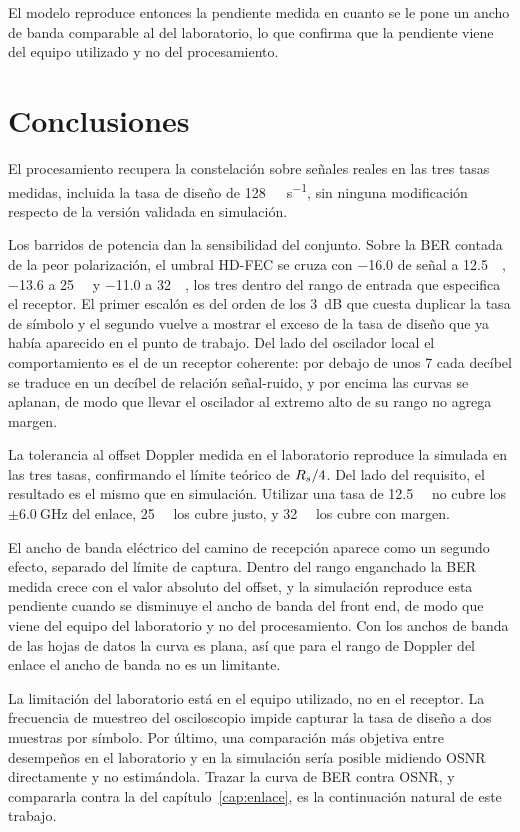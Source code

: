 El modelo reproduce entonces la pendiente medida en cuanto se le pone un ancho
de banda comparable al del laboratorio, lo que confirma que la
pendiente viene del equipo utilizado y no del procesamiento.


\section{Conclusiones}
\label{sec:exp-conclusiones}

El procesamiento recupera la constelaci\'on sobre se\~nales reales en las tres
tasas medidas, incluida la tasa de dise\~no de
\SI{128}{\giga\bit\per\second}, sin ninguna modificaci\'on respecto de la
versi\'on validada en simulaci\'on.

Los barridos de potencia dan la sensibilidad del conjunto. Sobre la BER
contada de la peor polarizaci\'on, el umbral HD-FEC se cruza con
\SI{-16.0}{\dBm} de se\~nal a \SI{12.5}{\giga\baud}, \SI{-13.6}{\dBm} a
\SI{25}{\giga\baud} y \SI{-11.0}{\dBm} a \SI{32}{\giga\baud}, los tres dentro
del rango de entrada que especifica el receptor. El primer escal\'on es del
orden de los \SI{3}{\dB} que cuesta duplicar la tasa de s\'imbolo y el segundo
vuelve a mostrar el exceso de la tasa de dise\~no que ya hab\'ia aparecido en
el punto de trabajo. Del lado del oscilador local el comportamiento es el de
un receptor coherente: por debajo de unos \SI{7}{\dBm} cada dec\'ibel se
traduce en un dec\'ibel de relaci\'on se\~nal-ruido, y por encima las curvas
se aplanan, de modo que llevar el oscilador al extremo alto de su rango no
agrega margen.


La tolerancia al offset Doppler medida en el laboratorio reproduce la simulada
en las tres tasas, confirmando el
l\'imite te\'orico de $R_{s}/4$. Del lado del requisito, el resultado es el mismo
que en simulaci\'on. Utilizar una tasa de \SI{12.5}{\giga\baud} no cubre los
$\pm\SI{6.0}{\giga\hertz}$ del enlace, \SI{25}{\giga\baud} los cubre
justo, y \SI{32}{\giga\baud} los cubre con margen.

El ancho de banda el\'ectrico del camino de recepci\'on aparece como un segundo
efecto, separado del l\'imite de captura. Dentro del rango enganchado la BER
medida crece con el valor absoluto del offset, y la simulaci\'on reproduce esta
pendiente cuando se disminuye el ancho de banda del front end, de modo que viene del equipo
del laboratorio y no del procesamiento. Con los anchos de banda de las hojas de
datos la curva es plana, as\'i que para el rango de Doppler del enlace el
ancho de banda no es un limitante.


La limitaci\'on del laboratorio est\'a en el equipo utilizado, no en el receptor. La
frecuencia de muestreo del osciloscopio impide capturar la tasa de dise\~no
a dos muestras por s\'imbolo. 
Por \'ultimo, una comparaci\'on m\'as objetiva entre desempeños en el laboratorio 
y en la simulaci\'on ser\'ia posible midiendo OSNR directamente y no estim\'andola. Trazar la curva de BER contra OSNR, y compararla
contra la del cap\'itulo~\ref{cap:enlace}, es la continuaci\'on natural de
este trabajo.
